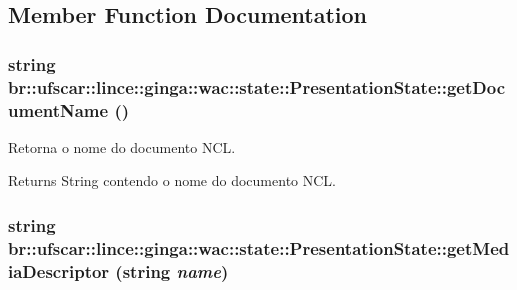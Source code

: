 \subsection{Member Function Documentation}
\hypertarget{classbr_1_1ufscar_1_1lince_1_1ginga_1_1wac_1_1state_1_1PresentationState_a2b47b9354872ae240b80f15ec346aee7}{
\subsubsection[{getDocumentName}]{\setlength{\rightskip}{0pt plus 5cm}string br::ufscar::lince::ginga::wac::state::PresentationState::getDocumentName ()}}
\label{classbr_1_1ufscar_1_1lince_1_1ginga_1_1wac_1_1state_1_1PresentationState_a2b47b9354872ae240b80f15ec346aee7}


Retorna o nome do documento NCL. \begin{DoxyReturn}{Returns}
String contendo o nome do documento NCL. 
\end{DoxyReturn}
\hypertarget{classbr_1_1ufscar_1_1lince_1_1ginga_1_1wac_1_1state_1_1PresentationState_a676f5c8a7880fe134f516ddbb4e94750}{
\subsubsection[{getMediaDescriptor}]{\setlength{\rightskip}{0pt plus 5cm}string br::ufscar::lince::ginga::wac::state::PresentationState::getMediaDescriptor (string {\em name})}}
\label{classbr_1_1ufscar_1_1lince_1_1ginga_1_1wac_1_1state_1_1PresentationState_a676f5c8a7880fe134f516ddbb4e94750}


